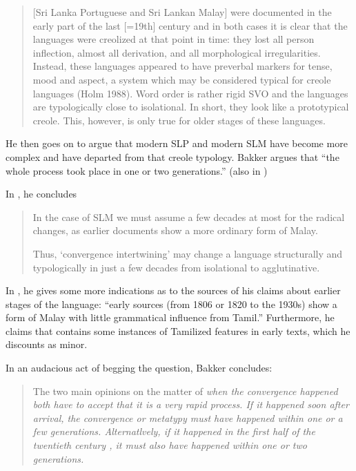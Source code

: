 \begin{quote}
[Sri Lanka Portuguese and Sri Lankan Malay] were documented in the early part of the last [=19th] century and in both cases it is clear that the languages were creolized at that point in time: they lost all person inflection, almost all derivation, and all morphological irregularities. Instead, these languages appeared to have preverbal markers for tense, mood and aspect, a system which may be considered typical for creole languages (Holm 1988). Word order is rather rigid SVO and the languages are typologically close to isolational. In short, they look like a prototypical creole. This, however, is only true for older stages of these languages.
\end{quote}

He then goes on to argue that modern SLP and modern SLM have become more complex and have departed from that creole typology. Bakker argues that ``the whole process took place in one or two generations.'' (also in \citet[153]{Bakker2006})

In \citet[607]{Bakker2000rapid}, he concludes

\begin{quote}
In the case of SLM we must \el{} assume a few decades at most for the radical changes, as earlier documents show a more ordinary form of Malay.

Thus, `convergence intertwining' may change a language structurally and typologically in just a few decades from isolational to agglutinative.
\end{quote}

In \citet{Bakker2006}, he gives some more indications as to the sources of his claims about earlier stages of the language: ``early sources (from 1806 or 1820 to the 1930s) show a form of Malay with little grammatical influence from Tamil.'' Furthermore, he claims that \citet{Hussainmiya1987} contains some instances of Tamilized features in early texts, which he discounts as minor.

In an audacious act of begging the question, Bakker concludes:

\begin{quote}
The two main opinions on the matter of \em when \em the convergence happened both have to accept that it is a very rapid process. If it happened soon after arrival, \el{} the convergence or metatypy must have happened within one or a few generations. Alternatlvely, if it happened in the first half of the twentieth century \el{}, it must also have happened within one or two generations.
\end{quote}

